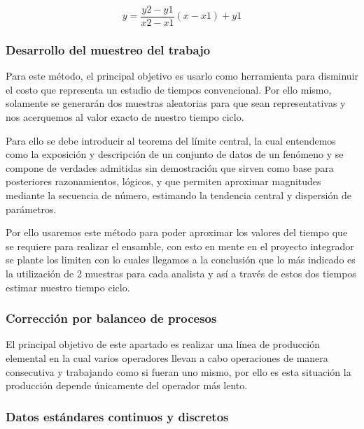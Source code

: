     
    
     \begin{equation}
            \label{equ:interpolacion}
           y = \frac{y2-y1}{x2-x1}(x-x1)+y1
        \end{equation}
    
    
    
    \subsubsection{Desarrollo del muestreo del trabajo}
    Para este método, el principal objetivo es usarlo como herramienta para disminuir el costo que representa un estudio de tiempos convencional. Por ello mismo, solamente se generarán dos muestras aleatorias para que sean representativas y nos acerquemos al valor exacto de nuestro tiempo ciclo.
    
    Para ello se debe introducir al teorema del límite central, la cual entendemos como la exposición y descripción de un conjunto de datos de un fenómeno y se compone de verdades admitidas sin demostración que sirven como base para posteriores razonamientos, lógicos, y que permiten aproximar magnitudes mediante la secuencia de número, estimando la tendencia central y dispersión de parámetros.
    
    Por ello usaremos este método para poder aproximar los valores del tiempo que se requiere para realizar el ensamble, con esto en mente en el proyecto integrador se plante los limiten con lo cuales llegamos a la conclusión que lo más indicado es la utilización de 2 muestras para cada analista y así a través de estos dos tiempos estimar nuestro tiempo ciclo.
    
    \subsubsection{Corrección por balanceo de procesos}
    
    El principal objetivo de este apartado es realizar una línea de producción elemental en la cual varios operadores llevan a cabo operaciones de manera consecutiva y trabajando como si fueran uno mismo, por ello es esta situación la producción depende únicamente del operador más lento.
    
    
    
    \subsubsection{Datos estándares continuos y discretos}
    
